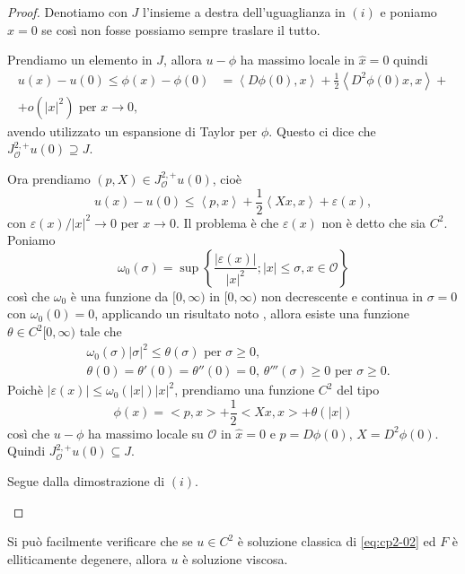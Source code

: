 \begin{osservazione}
\begin{proof}
Denotiamo con $J$ l'insieme a destra dell'uguaglianza in $(i)$ e poniamo $\hat{x}=0$ se così non fosse possiamo sempre traslare il tutto.
\begin{enumi}
\item  Prendiamo un elemento in $J$, allora $u-\phi$ ha massimo locale in $\hat{x}=0$ quindi
\[
\begin{aligned}
u(x) - u(0)\leq\phi(x) -\phi(0)&=\left<D\phi(0),x\right> + \frac{1}{2}\left<D^2\phi(0)x,x\right> +\\
+ o(|x|^2)\text{ per }x\to 0,
\end{aligned}
\]
avendo utilizzato un espansione di Taylor per $\phi$. Questo ci dice che $J_{\mathcal{O}}^{2,+}u(0)\supseteq J$.

Ora prendiamo $(p,X)\in J_{\mathcal{O}}^{2,+}u(0)$, cioè
\[
u(x) - u(0)\leq\left<p,x\right> + \frac{1}{2}\left<Xx,x\right> + \varepsilon(x),
\]
con $\varepsilon(x)/|x|^2\to 0$ per $x\to 0$.
Il problema è che $\varepsilon(x)$ non è detto che sia $C^2$. Poniamo 
\[
\omega_0(\sigma)=\sup\left\{\frac{|\varepsilon(x)|}{|x|^2}; |x|\leq\sigma,x\in\mathcal{O}\right\}
\]
così che $\omega_0$ è una funzione da $[0,\infty)$ in $[0,\infty)$ non decrescente e continua in $\sigma=0$ con $\omega_0(0)=0$, applicando un risultato noto \cite[vedi][§2 Lemma 2.1.9]{giga:main}, allora esiste una funzione $\theta\in C^2[0,\infty)$ tale che
\[
\begin{aligned}
&\omega_0(\sigma)|\sigma|^2\leq\theta(\sigma)\text{ per }\sigma\geq 0,\\
&\theta(0)=\theta'(0)=\theta''(0)=0,\,\theta'''(\sigma)\geq 0\text{ per }\sigma\geq 0.
\end{aligned}
\]
Poichè $|\varepsilon(x)|\leq\omega_0(|x|)|x|^2$, prendiamo una funzione $C^2$ del tipo
\[
\phi(x)=<p,x> + \frac{1}{2}<Xx,x> +\theta(|x|)
\]
così che $u-\phi$ ha massimo locale su $\mathcal{O}$ in $\hat{x}=0$ e $p=D\phi(0)$, $X=D^2\phi(0)$. Quindi $J_{\mathcal{O}}^{2,+}u(0)\subseteq J$.
\item  Segue dalla dimostrazione di $(i)$.
\end{enumi}
\end{proof}

\end{osservazione}

\begin{osservazione}
Si può facilmente verificare che se $u\in C^2$ è soluzione classica di \eqref{eq:cp2-02} ed $F$ è elliticamente degenere, allora $u$ è soluzione viscosa.
\end{osservazione}


